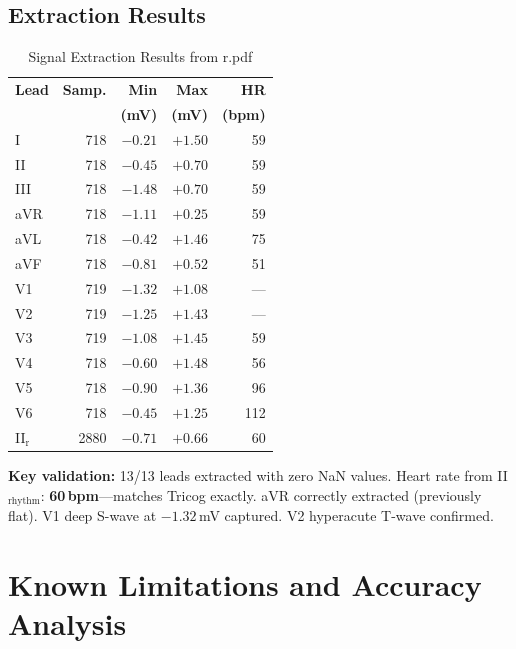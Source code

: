 \documentclass[conference]{IEEEtran}
\begin{document}
\subsection{Extraction Results}

\begin{table}[!t]
\centering
\caption{Signal Extraction Results from r.pdf}
\label{tab:results}
\footnotesize
\begin{tabular}{lrrrr}
  \toprule
  \textbf{Lead} & \textbf{Samp.} & \textbf{Min} & \textbf{Max} & \textbf{HR} \\
                &                & \textbf{(mV)} & \textbf{(mV)} & \textbf{(bpm)} \\
  \midrule
  I             & 718  & $-0.21$ & $+1.50$ & 59  \\
  II            & 718  & $-0.45$ & $+0.70$ & 59  \\
  III           & 718  & $-1.48$ & $+0.70$ & 59  \\
  aVR           & 718  & $-1.11$ & $+0.25$ & 59  \\
  aVL           & 718  & $-0.42$ & $+1.46$ & 75  \\
  aVF           & 718  & $-0.81$ & $+0.52$ & 51  \\
  V1            & 719  & $-1.32$ & $+1.08$ & --- \\
  V2            & 719  & $-1.25$ & $+1.43$ & --- \\
  V3            & 719  & $-1.08$ & $+1.45$ & 59  \\
  V4            & 718  & $-0.60$ & $+1.48$ & 56  \\
  V5            & 718  & $-0.90$ & $+1.36$ & 96  \\
  V6            & 718  & $-0.45$ & $+1.25$ & 112 \\
  II$_\text{r}$ & 2880 & $-0.71$ & $+0.66$ & 60  \\
  \bottomrule
\end{tabular}
\end{table}

\textbf{Key validation:} 13/13 leads extracted with zero NaN values. Heart
rate from II$_\text{rhythm}$: \textbf{60\,bpm}---matches Tricog exactly.
aVR correctly extracted (previously flat). V1 deep S-wave at $-1.32$\,mV
captured. V2 hyperacute T-wave confirmed.

\section{Known Limitations and Accuracy Analysis}
\end{document}
